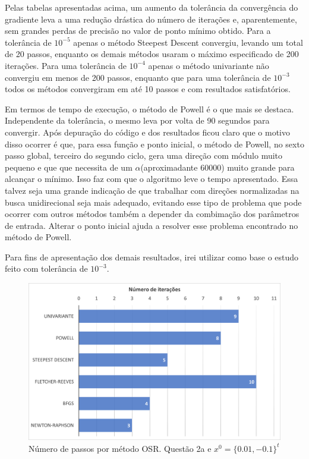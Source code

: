 \documentclass[10pt, a4paper]{article}
\begin{document}
Pelas tabelas apresentadas acima, um aumento da tolerância da convergência do gradiente leva a uma redução drástica
do número de iterações e, aparentemente, sem grandes perdas de precisão no valor de ponto mínimo obtido. Para a 
tolerância de $10^{-5}$ apenas o método Steepest Descent convergiu, levando um total de 20 passos, enquanto os 
demais métodos usaram o máximo especificado de 200 iterações. Para uma tolerância de $10^{-4}$ apenas o método univariante
não convergiu em menos de 200 passos, enquanto que para uma tolerância de $10^{-3}$ todos os métodos convergiram em até 10
passos e com resultados satisfatórios.

Em termos de tempo de execução, o método de Powell é o que mais se destaca. Independente da tolerância, o mesmo leva por volta
de 90 segundos para convergir. Após depuração do código e dos resultados ficou claro que o motivo disso ocorrer é que, 
para essa função e ponto inicial, o método de Powell, no sexto passo global, terceiro do segundo ciclo, gera uma direção com módulo muito pequeno e que
que necessita de um $\alpha$(aproximadante 60000) muito grande para alcançar o mínimo. Isso faz com que o algoritmo leve o tempo apresentado.
Essa talvez seja uma grande indicação de que trabalhar com direções normalizadas na busca unidirecional
seja mais adequado, evitando esse tipo de problema que pode ocorrer com outros métodos também a depender da combimação 
dos parâmetros de entrada. Alterar o ponto inicial ajuda a resolver esse problema encontrado no método de Powell.

Para fins de apresentação dos demais resultados, irei utilizar como base o estudo feito com tolerância de $10^{-3}$.

\begin{figure}[H]
  \centering
  \includegraphics[scale=0.4]{figuras/q2a_passos_P1.PNG}
  \caption{Número de passos por método OSR. Questão 2a e $x^0 = \{0.01,-0.1\}^t$}
\end{figure}
\end{document}
